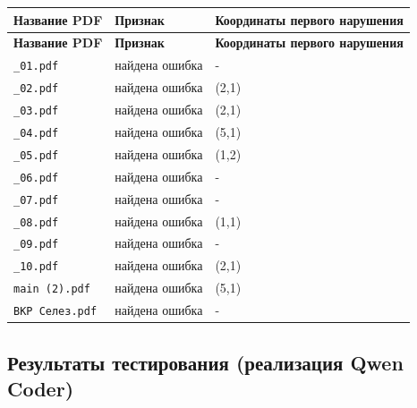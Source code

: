 \begin{longtable}{|p{}|p{}|p{}|}
\hline
\textbf{Название PDF} & \textbf{Признак} & \textbf{Координаты первого нарушения} \\
\hline
\endfirsthead
\hline
\textbf{Название PDF} & \textbf{Признак} & \textbf{Координаты первого нарушения} \\
\hline
\endhead

\texttt{\_01.pdf} & найдена ошибка & - \\ \hline
\texttt{\_02.pdf} & найдена ошибка & (2,1) \\ \hline
\texttt{\_03.pdf} & найдена ошибка & (2,1) \\ \hline
\texttt{\_04.pdf} & найдена ошибка & (5,1) \\ \hline
\texttt{\_05.pdf} & найдена ошибка & (1,2) \\ \hline
\texttt{\_06.pdf} & найдена ошибка & - \\ \hline
\texttt{\_07.pdf} & найдена ошибка & - \\ \hline
\texttt{\_08.pdf} & найдена ошибка & (1,1) \\ \hline
\texttt{\_09.pdf} & найдена ошибка & - \\ \hline
\texttt{\_10.pdf} & найдена ошибка & (2,1) \\ \hline
\texttt{main (2).pdf} & найдена ошибка & (5,1) \\ \hline
\texttt{ВКР Селез.pdf} & найдена ошибка & - \\ \hline

\end{longtable}

\subsection{Результаты тестирования (реализация Qwen Coder)}

